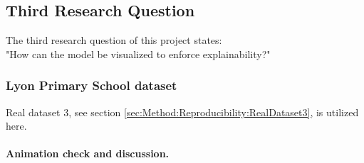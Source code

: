 \subsection{Third Research Question}
\label{sec:ResearchQuestion3}
The third research question of this project states:
\\
"How can the model be visualized to enforce explainability?"



\subsubsection{Lyon Primary School dataset}
\label{sec:ResearchQuestion2:LyonDataset}

Real dataset 3, see section \ref{sec:Method:Reproducibility:RealDataset3}, is utilized here.
\\\\
\textbf{Animation check and discussion.}






